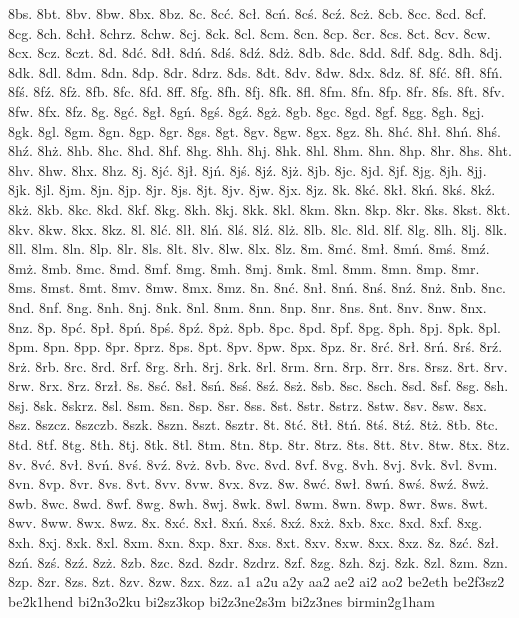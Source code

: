 {8bs.
8bt.
8bv.
8bw.
8bx.
8bz.
8c.
8cć.
8cł.
8cń.
8cś.
8cź.
8cż.
8cb.
8cc.
8cd.
8cf.
8cg.
8ch.
8chł.
8chrz.
8chw.
8cj.
8ck.
8cl.
8cm.
8cn.
8cp.
8cr.
8cs.
8ct.
8cv.
8cw.
8cx.
8cz.
8czt.
8d.
8dć.
8dł.
8dń.
8dś.
8dź.
8dż.
8db.
8dc.
8dd.
8df.
8dg.
8dh.
8dj.
8dk.
8dl.
8dm.
8dn.
8dp.
8dr.
8drz.
8ds.
8dt.
8dv.
8dw.
8dx.
8dz.
8f.
8fć.
8fł.
8fń.
8fś.
8fź.
8fż.
8fb.
8fc.
8fd.
8ff.
8fg.
8fh.
8fj.
8fk.
8fl.
8fm.
8fn.
8fp.
8fr.
8fs.
8ft.
8fv.
8fw.
8fx.
8fz.
8g.
8gć.
8gł.
8gń.
8gś.
8gź.
8gż.
8gb.
8gc.
8gd.
8gf.
8gg.
8gh.
8gj.
8gk.
8gl.
8gm.
8gn.
8gp.
8gr.
8gs.
8gt.
8gv.
8gw.
8gx.
8gz.
8h.
8hć.
8hł.
8hń.
8hś.
8hź.
8hż.
8hb.
8hc.
8hd.
8hf.
8hg.
8hh.
8hj.
8hk.
8hl.
8hm.
8hn.
8hp.
8hr.
8hs.
8ht.
8hv.
8hw.
8hx.
8hz.
8j.
8jć.
8jł.
8jń.
8jś.
8jź.
8jż.
8jb.
8jc.
8jd.
8jf.
8jg.
8jh.
8jj.
8jk.
8jl.
8jm.
8jn.
8jp.
8jr.
8js.
8jt.
8jv.
8jw.
8jx.
8jz.
8k.
8kć.
8kł.
8kń.
8kś.
8kź.
8kż.
8kb.
8kc.
8kd.
8kf.
8kg.
8kh.
8kj.
8kk.
8kl.
8km.
8kn.
8kp.
8kr.
8ks.
8kst.
8kt.
8kv.
8kw.
8kx.
8kz.
8l.
8lć.
8lł.
8lń.
8lś.
8lź.
8lż.
8lb.
8lc.
8ld.
8lf.
8lg.
8lh.
8lj.
8lk.
8ll.
8lm.
8ln.
8lp.
8lr.
8ls.
8lt.
8lv.
8lw.
8lx.
8lz.
8m.
8mć.
8mł.
8mń.
8mś.
8mź.
8mż.
8mb.
8mc.
8md.
8mf.
8mg.
8mh.
8mj.
8mk.
8ml.
8mm.
8mn.
8mp.
8mr.
8ms.
8mst.
8mt.
8mv.
8mw.
8mx.
8mz.
8n.
8nć.
8nł.
8nń.
8nś.
8nź.
8nż.
8nb.
8nc.
8nd.
8nf.
8ng.
8nh.
8nj.
8nk.
8nl.
8nm.
8nn.
8np.
8nr.
8ns.
8nt.
8nv.
8nw.
8nx.
8nz.
8p.
8pć.
8pł.
8pń.
8pś.
8pź.
8pż.
8pb.
8pc.
8pd.
8pf.
8pg.
8ph.
8pj.
8pk.
8pl.
8pm.
8pn.
8pp.
8pr.
8prz.
8ps.
8pt.
8pv.
8pw.
8px.
8pz.
8r.
8rć.
8rł.
8rń.
8rś.
8rź.
8rż.
8rb.
8rc.
8rd.
8rf.
8rg.
8rh.
8rj.
8rk.
8rl.
8rm.
8rn.
8rp.
8rr.
8rs.
8rsz.
8rt.
8rv.
8rw.
8rx.
8rz.
8rzł.
8s.
8sć.
8sł.
8sń.
8sś.
8sź.
8sż.
8sb.
8sc.
8sch.
8sd.
8sf.
8sg.
8sh.
8sj.
8sk.
8skrz.
8sl.
8sm.
8sn.
8sp.
8sr.
8ss.
8st.
8str.
8strz.
8stw.
8sv.
8sw.
8sx.
8sz.
8szcz.
8szczb.
8szk.
8szn.
8szt.
8sztr.
8t.
8tć.
8tł.
8tń.
8tś.
8tź.
8tż.
8tb.
8tc.
8td.
8tf.
8tg.
8th.
8tj.
8tk.
8tl.
8tm.
8tn.
8tp.
8tr.
8trz.
8ts.
8tt.
8tv.
8tw.
8tx.
8tz.
8v.
8vć.
8vł.
8vń.
8vś.
8vź.
8vż.
8vb.
8vc.
8vd.
8vf.
8vg.
8vh.
8vj.
8vk.
8vl.
8vm.
8vn.
8vp.
8vr.
8vs.
8vt.
8vv.
8vw.
8vx.
8vz.
8w.
8wć.
8wł.
8wń.
8wś.
8wź.
8wż.
8wb.
8wc.
8wd.
8wf.
8wg.
8wh.
8wj.
8wk.
8wl.
8wm.
8wn.
8wp.
8wr.
8ws.
8wt.
8wv.
8ww.
8wx.
8wz.
8x.
8xć.
8xł.
8xń.
8xś.
8xź.
8xż.
8xb.
8xc.
8xd.
8xf.
8xg.
8xh.
8xj.
8xk.
8xl.
8xm.
8xn.
8xp.
8xr.
8xs.
8xt.
8xv.
8xw.
8xx.
8xz.
8z.
8zć.
8zł.
8zń.
8zś.
8zź.
8zż.
8zb.
8zc.
8zd.
8zdr.
8zdrz.
8zf.
8zg.
8zh.
8zj.
8zk.
8zl.
8zm.
8zn.
8zp.
8zr.
8zs.
8zt.
8zv.
8zw.
8zx.
8zz.
a1
a2u
a2y
aa2
ae2
ai2
ao2
be2eth
be2f3sz2
be2k1hend
bi2n3o2ku
bi2sz3kop
bi2z3ne2s3m
bi2z3nes
birmin2g1ham
}
